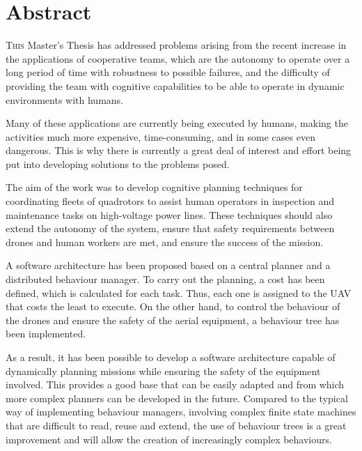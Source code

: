 \chapter*{Abstract}
\pagestyle{especial}
{}

\lettrine[lraise=-0.1, lines=2, loversize=0.2]{T}{his} Master's Thesis has addressed problems arising from the recent increase in the applications of cooperative  teams, which are the autonomy to operate over a long period of time with robustness to possible failures, and the difficulty of providing the team with cognitive capabilities to be able to operate in dynamic environments with humans.

Many of these applications are currently being executed by humans, making the activities much more expensive, time-consuming, and in some cases even dangerous. This is why there is currently a great deal of interest and effort being put into developing solutions to the problems posed. 

The aim of the work was to develop cognitive planning techniques for coordinating fleets of quadrotors to assist human operators in inspection and maintenance tasks on high-voltage power lines. These techniques should also extend the autonomy of the system, ensure that safety requirements between drones and human workers are met, and ensure the success of the mission.

A software architecture has been proposed based on a central planner and a distributed behaviour manager. To carry out the planning, a cost has been defined, which is calculated for each task. Thus, each one is assigned to the \gls{UAV} that costs the least to execute. On the other hand, to control the behaviour of the drones and ensure the safety of the aerial equipment, a behaviour tree has been implemented.

As a result, it has been possible to develop a software architecture capable of dynamically planning missions while ensuring the safety of the equipment involved. This provides a good base that can be easily adapted and from which more complex planners can be developed in the future. Compared to the typical way of implementing behaviour managers, involving complex finite state machines that are difficult to read, reuse and extend, the use of behaviour trees is a great improvement and will allow the creation of increasingly complex behaviours.